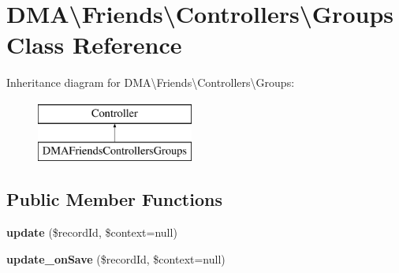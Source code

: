 \hypertarget{classDMA_1_1Friends_1_1Controllers_1_1Groups}{\section{D\-M\-A\textbackslash{}Friends\textbackslash{}Controllers\textbackslash{}Groups Class Reference}
\label{classDMA_1_1Friends_1_1Controllers_1_1Groups}
}
Inheritance diagram for D\-M\-A\textbackslash{}Friends\textbackslash{}Controllers\textbackslash{}Groups\-:\begin{figure}[H]
\begin{center}
\leavevmode
\includegraphics[height=2.000000cm]{d3/d59/classDMA_1_1Friends_1_1Controllers_1_1Groups}
\end{center}
\end{figure}
\subsection*{Public Member Functions}
\begin{DoxyCompactItemize}
\item 
\hypertarget{classDMA_1_1Friends_1_1Controllers_1_1Groups_ad6669dcafea2925265b4e2050270692d}{{\bfseries update} (\$record\-Id, \$context=null)}\label{classDMA_1_1Friends_1_1Controllers_1_1Groups_ad6669dcafea2925265b4e2050270692d}

\item 
\hypertarget{classDMA_1_1Friends_1_1Controllers_1_1Groups_a5699a6886233e781df7f569db15e2900}{{\bfseries update\-\_\-on\-Save} (\$record\-Id, \$context=null)}\label{classDMA_1_1Friends_1_1Controllers_1_1Groups_a5699a6886233e781df7f569db15e2900}

\end{DoxyCompactItemize}
